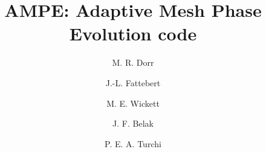 \documentclass[letterpaper,12pt]{amsdtx}
\begin{document}
\title{AMPE: Adaptive Mesh Phase Evolution code}
\author{M. R. Dorr \and J.-L. Fattebert \and M. E. Wickett \and
  J. F. Belak \and P. E. A. Turchi}
\maketitle

\tableofcontents




\appendix




\end{document}
